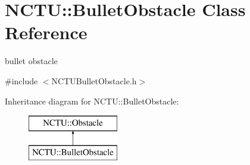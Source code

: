 \hypertarget{class_n_c_t_u_1_1_bullet_obstacle}{}\section{N\+C\+TU\+:\+:Bullet\+Obstacle Class Reference}
\label{class_n_c_t_u_1_1_bullet_obstacle}


bullet obstacle  




{\ttfamily \#include $<$N\+C\+T\+U\+Bullet\+Obstacle.\+h$>$}

Inheritance diagram for N\+C\+TU\+:\+:Bullet\+Obstacle\+:\begin{figure}[H]
\begin{center}
\leavevmode
\includegraphics[height=2.000000cm]{class_n_c_t_u_1_1_bullet_obstacle}
\end{center}
\end{figure}
